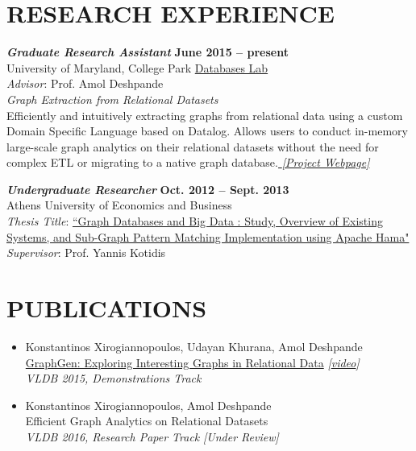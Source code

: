 \documentclass[margin, 10pt]{res} %
\begin{document}
\begin{resume}

\section{RESEARCH EXPERIENCE}

{\sl \textbf{Graduate Research Assistant}} \hfill \textbf{June 2015 -- present} \\
University of Maryland, College Park \href{http://www.cs.umd.edu/~amol/DBGroup/pubs.html}{Databases Lab}\\
\textit{Advisor}: Prof. Amol Deshpande\\
{\sl Graph Extraction from Relational Datasets}\\
  Efficiently and intuitively extracting graphs from relational data using a custom Domain Specific Language based on Datalog. Allows users to conduct in-memory large-scale graph analytics on their relational datasets without the need for complex ETL or migrating to a native graph database.\href{http://konstantinosx.github.io/graphgen-project/}{\textit{ [Project Webpage]}}

{\sl \textbf{Undergraduate Researcher}} \hfill \textbf{Oct. 2012 -- Sept. 2013}\\
Athens University of Economics and Business\\
\textit{Thesis Title}:
\href{https://drive.google.com/open?id=0B20MIwp_I7FlVFlNVWtQb3VXTmM}{``Graph Databases and Big Data : Study, Overview of Existing Systems, and Sub-Graph Pattern Matching Implementation using Apache Hama"}\\
\textit{Supervisor}: Prof. Yannis Kotidis


\section{PUBLICATIONS }

\begin{itemize}
   \item Konstantinos Xirogiannopoulos, Udayan Khurana, Amol Deshpande\\
  \href{http://www.vldb.org/pvldb/vol8/p2032-xirogiannopoulos.pdf}{GraphGen: Exploring Interesting Graphs in Relational Data} \textit{[\href{https://www.youtube.com/watch?v=GDVBLv-oedQ}{video}]}\\
  \textit{VLDB 2015, Demonstrations Track}
  \item Konstantinos Xirogiannopoulos, Amol Deshpande\\
  Efficient Graph Analytics on Relational Datasets\\
  \textit{ VLDB 2016, Research Paper Track} \textit{ [Under Review]}
\end{itemize}


\end{resume}
\end{document}
